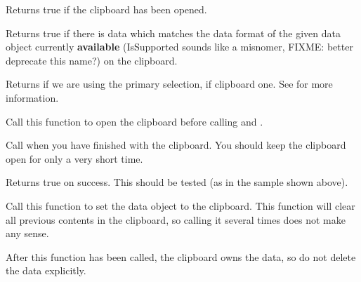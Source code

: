 \label{wxclipboardisopened}


Returns true if the clipboard has been opened.


\label{wxclipboardissupported}


Returns true if there is data which matches the data format of the given data object currently {\bf available} (IsSupported sounds like a misnomer, FIXME: better deprecate this name?) on the clipboard.


\label{wxclipboardisusingprimaryselection}


Returns \true if we are using the primary selection, \false if clipboard one.
See  for more information.


\label{wxclipboardopen}


Call this function to open the clipboard before calling  
and .

Call  when you have finished with the clipboard. You
should keep the clipboard open for only a very short time.

Returns true on success. This should be tested (as in the sample shown above).


\label{wxclipboardsetdata}


Call this function to set the data object to the clipboard. This function will
clear all previous contents in the clipboard, so calling it several times
does not make any sense.

After this function has been called, the clipboard owns the data, so do not delete
the data explicitly.




\label{wxclipboarduseprimary}

